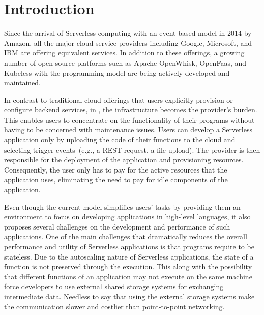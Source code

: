 \section{Introduction}

Since the arrival of Serverless computing with an event-based \faas model in 2014 by 
Amazon,
all the major cloud service providers including 
Google,
Microsoft,
and IBM
are offering equivalent services. 
%
In addition to these offerings, a growing number of open-source platforms 
such as Apache OpenWhisk,
OpenFaas,
and Kubeless
with the \faas programming model are being actively developed and maintained.

In contrast to traditional cloud offerings that users explicitly provision or configure 
backend services, in \faas, the infrastructure becomes the provider's burden.
This enables users to concentrate on the functionality of their programs 
without having to be concerned with maintenance issues. 
Users can develop a Serverless application only by uploading the code of their 
functions to the cloud and selecting trigger events~(e.g., a REST request, 
a file upload). The provider is then responsible for the deployment of the 
application and provisioning resources. Consequently, the user only has 
to pay for the active resources that the application uses, eliminating the 
need to pay for idle components of the application.

Even though the current \faas model simplifies users' tasks by providing 
them an environment to focus on developing applications in high-level 
languages, it also proposes several challenges on the development 
and performance of such applications. One of the main challenges 
that dramatically reduces the overall performance and utility of 
Serverless applications is that programs require to be 
stateless\cite{hellerstein2018serverless}.
Due to the autoscaling nature of Serverless applications, the state of 
a function is not preserved through the execution. This along with the
possibility that different functions of an application may not execute 
on the same machine force developers to use external shared 
storage systems for exchanging intermediate data\cite{klimovic2018understanding}.
Needless to say that using the external storage systems make the 
communication slower and costlier than point-to-point networking.

